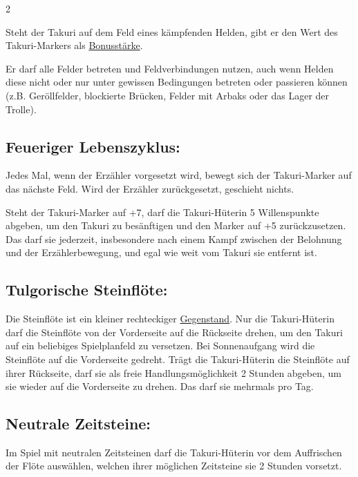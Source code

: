 \documentclass[10pt, a4paper, oneside]{book}
\begin{document}
\begin{multicols*}{2}
\begin{nobgcolor}
Steht der Takuri auf dem Feld eines kämpfenden Helden, gibt er den Wert des Takuri-Markers als \hyperref[Bonusstärke]{Bonusstärke}.
\supercite{MH:Takuri}

Er darf alle Felder betreten und Feldverbindungen nutzen, auch wenn Helden diese nicht oder nur unter gewissen Bedingungen betreten oder passieren können (z.B. Geröllfelder, blockierte Brücken, Felder mit Arbaks oder das Lager der Trolle).
\supercite{MH:Begleitheft}


\subsection{Feueriger Lebenszyklus:}

Jedes Mal, wenn der Erzähler vorgesetzt wird, bewegt sich der Takuri-Marker auf das nächste Feld. Wird der Erzähler zurückgesetzt, geschieht nichts.
\supercite{MH:Begleitheft}

Steht der Takuri-Marker auf +7, darf die Takuri-Hüterin 5 Willenspunkte abgeben, um den Takuri zu besänftigen und den Marker auf +5 zurückzusetzen.
\supercite{MH:Takuri}
Das darf sie jederzeit, insbesondere nach einem Kampf zwischen der Belohnung und der Erzählerbewegung\supercite{89455}, und egal wie weit vom Takuri sie entfernt ist.





\subsection{Tulgorische Steinflöte:}

Die Steinflöte ist ein kleiner rechteckiger \hyperref[Gegenstände und Sonderplättchen]{Gegenstand}.
Nur die Takuri-Hüterin darf die Steinflöte von der Vorderseite auf die Rückseite drehen, um den Takuri auf ein beliebiges Spielplanfeld zu versetzen.
Bei Sonnenaufgang wird die Steinflöte auf die Vorderseite gedreht.
Trägt die Takuri-Hüterin die Steinflöte auf ihrer Rückseite, darf sie als freie Handlungsmöglichkeit 2 Stunden abgeben, um sie wieder auf die Vorderseite zu drehen. Das darf sie mehrmals pro Tag.
\supercite{MH:Begleitheft}



\subsection{Neutrale Zeitsteine:}

Im Spiel mit neutralen Zeitsteinen darf die Takuri-Hüterin vor dem Auffrischen der Flöte auswählen, welchen ihrer möglichen Zeitsteine sie 2 Stunden vorsetzt.




\end{nobgcolor}
\end{multicols*}
\end{document}
